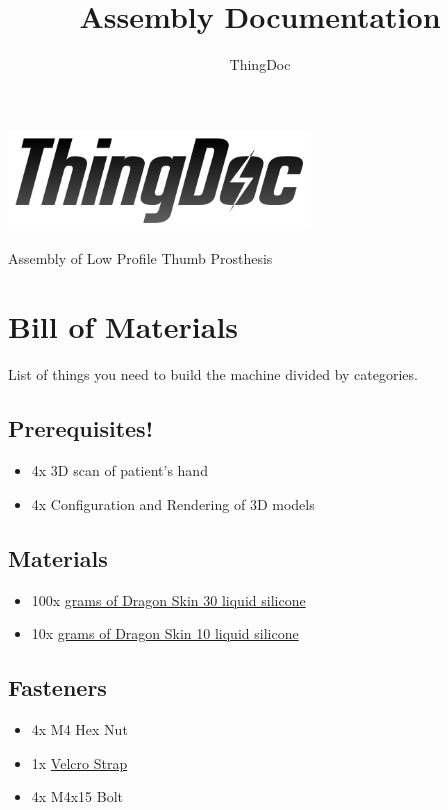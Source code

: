\documentclass[11pt]{article}
\title{Assembly Documentation}
\author{ThingDoc}
\begin{document}
\maketitle
\begin{center}
\includegraphics[width=8cm]{logo.png}
\end{center}
Assembly of Low Profile Thumb Prosthesis

\newpage

\tableofcontents

\newpage

\section{Bill of Materials}
List of things you need to build the machine divided by categories.

\subsection{Prerequisites!}
\begin{itemize}
\item 4x 3D scan of patient's hand
\item 4x Configuration and Rendering of 3D models
\end{itemize}

\subsection{Materials}
\begin{itemize}
\item 100x \hyperlink{thing_g\_dragon\_skin\_30}{grams of Dragon Skin 30 liquid silicone}
\item 10x \hyperlink{thing_g\_dragon\_skin\_10}{grams of Dragon Skin 10 liquid silicone}
\end{itemize}

\subsection{Fasteners}
\begin{itemize}
\item 4x M4 Hex Nut
\item 1x \hyperlink{thing_velcro\_strap}{Velcro Strap}
\item 4x M4x15 Bolt
\end{itemize}
\end{document}
